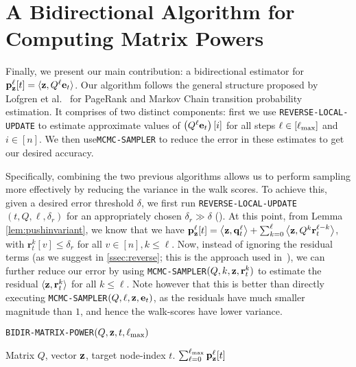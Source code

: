 
\section{A Bidirectional Algorithm for Computing Matrix Powers}
\label{ssec:bidiralgo}

Finally, we present our main contribution: a bidirectional estimator for ${\mathbf{p}}_\mathbf{z}^{\ell}[t] = \langle\mathbf{z},Q^{\ell}\mathbf{e}_t\rangle$. 
Our algorithm follows the general structure proposed by Lofgren et al.~\cite{Lofgren2014,banerjee2015fast} for PageRank and Markov Chain transition probability estimation.
It comprises of two distinct components: first we use  \texttt{REVERSE-LOCAL-UPDATE} to estimate approximate values of $\left(Q^{\ell}\mathbf{e}_t\right)[i]$ for all steps $\ell \in[\ell_{\max}]$ and $i\in[n]$. 
We then use\texttt{MCMC-SAMPLER} to reduce the error in these estimates to get our desired accuracy.


Specifically, combining the two previous algorithms allows us to perform sampling more effectively by reducing the variance in the walk scores.
To achieve this, given a desired error threshold $\delta$, we first run \texttt{REVERSE-LOCAL-UPDATE}$(t,Q,\ell,\delta_r)$ for an appropriately chosen $\delta_r\gg\delta$ (). 
At this point, from Lemma \ref{lem:pushinvariant}, we know that we have
${\mathbf{p}}_\mathbf{z}^{\ell}[t] = \left< \mathbf{z}, \mathbf{q}_t^{\ell} \right> + \sum_{k=0}^{\ell} \left<\mathbf{z}, Q^k\mathbf{r}_t^{\ell-k}\right>$, with $\mathbf{r}_t^{k}[v]\leq\delta_r$ for all $v\in[n],k\leq\ell$.
Now, instead of ignoring the residual terms (as we suggest in \ref{ssec:reverse}; this is the approach used in~\cite{andersen2007local,lee2014asynchronous}), we can further reduce our error by using \texttt{MCMC-SAMPLER}$(Q,k,\mathbf{z},\mathbf{r}_t^k)$ to estimate the residual $\langle\mathbf{z},\mathbf{r}_t^k\rangle$ for all $k\leq\ell$.
Note however that this is better than directly executing \texttt{MCMC-SAMPLER}$(Q,\ell,\mathbf{z},\mathbf{e}_{t})$, as the residuals have much smaller magnitude than $1$, and hence the walk-scores have lower variance.
\begin{algorithm}[ht]
\caption{\texttt{BIDIR-MATRIX-POWER}$(Q, \mathbf{z}, t,\ell_{\max})$}
\label{alg:linearsysest}
\begin{algorithmic}[1]
\REQUIRE Matrix $Q$, vector $\mathbf{z}$, target node-index $t$.
\ENDFOR
{}
\ENDFOR
\RETURN $\sum_{\ell=0}^{\ell_{\max}} {\mathbf{p}}_\mathbf{z}^{\ell}[t]$ 
\end{algorithmic}
\end{algorithm} 

